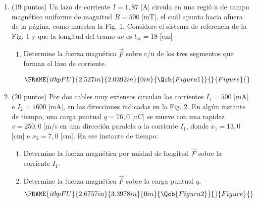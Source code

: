 \documentclass{article}
\begin{document}
\begin{enumerate}
\item (19 puntos) Un lazo de corriente $I=1,87$ [A] circula en una regi\'{o}%
n de campo magn\'{e}tico uniforme de magnitud $B=500$ [mT], el cu\'{a}l
apunta hacia afuera de la p\'{a}gina, como muestra la Fig. 1. Considere el
sistema de referencia de la Fig. 1 y que la longitud del tramo $ac$ es $%
l_{ac}=18$ [cm]

\begin{enumerate}
\item Determine la fuerza magn\'{e}tica $\vec{F}$ sobre c/u de los tres
segmentos que forman el lazo de corriente.

\begin{equation*}
\FRAME{itbpFU}{2.527in}{2.0392in}{0in}{\Qcb{Figura 1}}{}{Figure}{\special%
{language "Scientific Word";type "GRAPHIC";maintain-aspect-ratio
TRUE;display "USEDEF";valid_file "T";width 2.527in;height 2.0392in;depth
0in;original-width 5.0531in;original-height 4.0707in;cropleft "0";croptop
"1";cropright "1";cropbottom "0";tempfilename
'QWLOIO05.bmp';tempfile-properties "XPR";}}
\end{equation*}%
\pagebreak
\end{enumerate}

\item (20 puntos) Por dos cables muy extensos circulan las corrientes $%
I_{1}=500$ [mA] e $I_{2}=1600$ [mA], en las direcciones indicadas en la Fig.
2. En alg\'{u}n instante de tiempo, una carga puntual $q=76,0$ [nC] se mueve
con una rapidez $v=250,0$ [m/s\NEG{]} en una direcci\'{o}n paralela a la
corriente $I_{1}$, donde $x_{1}=13,0$ [cm] e $x_{2}=7,0$ [cm]. En ese
instante de tiempo:

\begin{enumerate}
\item Determine la fuerza magn\'{e}tica por unidad de longitud $\vec{F}$
sobre la corriente $I_{1}.$

\item Determine la fuerza magn\'{e}tica $\vec{F}$ sobre la carga puntual $q.$
\begin{equation*}
\FRAME{itbpFU}{2.6757in}{3.3978in}{0in}{\Qcb{Figura 2}}{}{Figure}{\special%
{language "Scientific Word";type "GRAPHIC";maintain-aspect-ratio
TRUE;display "USEDEF";valid_file "T";width 2.6757in;height 3.3978in;depth
0in;original-width 4.964in;original-height 6.3244in;cropleft "0";croptop
"1";cropright "1";cropbottom "0";tempfilename
'QWLQJO06.bmp';tempfile-properties "XPR";}}
\end{equation*}
\end{enumerate}


\end{enumerate}
\end{document}
